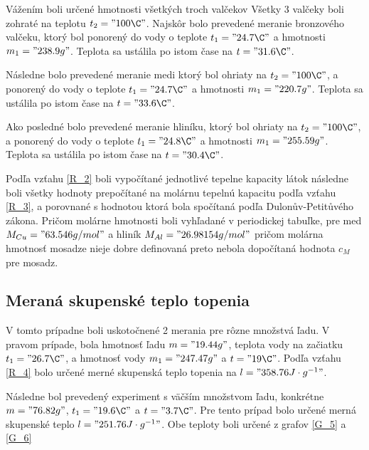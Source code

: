 \documentclass[a4paper,10pt]{article}
\begin{document}
Vážením boli určené hmotnosti všetkých troch valčekov 
Všetky 3 valčeky boli zohraté na teplotu $t_2="100 \C"$.
Najskôr bolo prevedené meranie bronzového valčeku, ktorý bol ponorený do vody o teplote $t_1="24.7 \C"$ a hmotnosti $m_1 ="238.9 g"$.
Teplota sa ustálila po istom čase na $t="31.6 \C"$.

Následne bolo prevedené meranie medi ktorý bol ohriaty na $t_2="100 \C"$, a ponorený do vody o teplote $t_1="24.7 \C"$ a hmotnosti $m_1 ="220.7 g"$.
Teplota sa ustálila po istom čase na $t="33.6 \C"$.

Ako posledné bolo prevedené meranie hliníku, ktorý bol ohriaty na $t_2="100 \C"$, a ponorený do vody o teplote $t_1="24.8 \C"$ a hmotnosti $m_1 ="255.59 g"$.
Teplota sa ustálila po istom čase na $t="30.4 \C"$.

Podľa vzťahu \ref{R_2} boli vypočítané jednotlivé tepelne kapacity látok
následne boli všetky hodnoty prepočítané na molárnu tepelnú kapacitu podľa vzťahu \ref{R_3},
a porovnané s hodnotou ktorá bola spočítaná podľa Dulonův-Petitůvého zákona.
Pričom molárne hmotnosti boli vyhľadané v periodickej tabuľke\cite{C_1}, 
pre med $M_{Cu}="63.546 g/mol"$ a hliník $M_{Al}="26.98154 g/mol"$
pričom molárna hmotnosť mosadze nieje dobre definovaná preto nebola dopočítaná hodnota $c_M$ pre mosadz.

\subsection{Meraná skupenské teplo topenia}

V tomto prípadne boli uskotočnené 2 merania pre rôzne množstvá ľadu.
V pravom prípade, bola hmotnosť ľadu $m="19.44 g"$, teplota vody na začiatku $t_1="26.7 \C"$, a hmotnosť vody $m_1="247.47 g"$ a $t="19 \C"$.
Podľa vzťahu \ref{R_4} bolo určené merné skupenská teplo topenia na $l="358.76 J\cdot g^{-1}"$.

Následne bol prevedený experiment s väčším množstvom ľadu, konkrétne $m="76.82 g"$, $t_1="19.6 \C"$ a $t="3.7 \C"$. 
Pre tento prípad bolo určené merná skupenské teplo $l="251.76 J\cdot g^{-1}"$.
Obe teploty boli určené z grafov \ref{G_5} a \ref{G_6}
\end{document}
